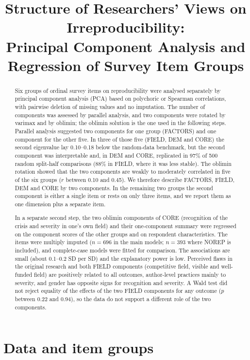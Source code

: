 \documentclass[11pt,a4paper]{article}
\title{Structure of Researchers' Views on Irreproducibility:\\
Principal Component Analysis and Regression of Survey Item Groups}
\date{}
\begin{document}
\maketitle

\begin{abstract}
\noindent
Six groups of ordinal survey items on reproducibility were analysed separately by principal component analysis (PCA) based on polychoric or Spearman correlations, with pairwise deletion of missing values and no imputation. The number of components was assessed by parallel analysis, and two components were rotated by varimax and by oblimin; the oblimin solution is the one used in the following steps. Parallel analysis suggested two components for one group (FACTORS) and one component for the other five. In three of those five (FIELD, DEM and CORE) the second eigenvalue lay 0.10--0.18 below the random-data benchmark, but the second component was interpretable and, in DEM and CORE, replicated in 97\% of 500 random split-half comparisons (88\% in FIELD, where it was less stable). The oblimin rotation showed that the two components are weakly to moderately correlated in five of the six groups ($r$ between 0.10 and 0.45). We therefore describe FACTORS, FIELD, DEM and CORE by two components. In the remaining two groups the second component is either a single item or rests on only three items, and we report them as one dimension plus a separate item.

\medskip\noindent
In a separate second step, the two oblimin components of CORE (recognition of the crisis and severity in one's own field) and their one-component summary were regressed on the component scores of the other groups and on respondent characteristics. The items were multiply imputed ($n=696$ in the main models; $n=393$ where NOREP is included), and complete-case models were fitted for comparison. The associations are small (about 0.1--0.2 SD per SD) and the explanatory power is low. Perceived flaws in the original research and both FIELD components (competitive field, visible and well-funded field) are positively related to all outcomes, author-level practices mainly to severity, and gender has opposite signs for recognition and severity. A Wald test did not reject equality of the effects of the two FIELD components for any outcome ($p$ between 0.22 and 0.94), so the data do not support a different role of the two components.
\end{abstract}

\section{Data and item groups}
\end{document}
